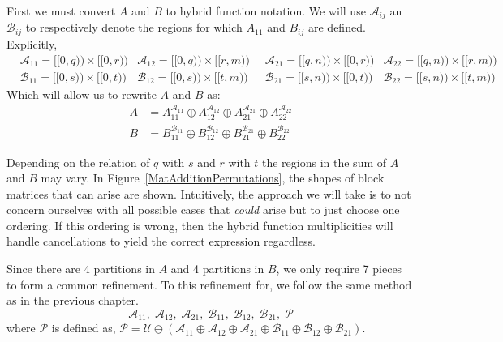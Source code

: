 First we must convert $A$ and $B$ to hybrid function notation. 
We will use $\mathcal{A}_{ij}$ an $\mathcal{B}_{ij}$ to respectively denote the regions for which 
$A_{11}$ and $B_{ij}$ are defined.
Explicitly,
\begin{align*}
	&\mathcal{A}_{11} = [\![0,q)\!) \times [\![0,r)\!) &
	\mathcal{A}_{12} = [\![0,q)\!) \times [\![r,m)\!)\;\; &
	\mathcal{A}_{21} = [\![q,n)\!) \times [\![0,r)\!) &
	\mathcal{A}_{22} = [\![q,n)\!) \times [\![r,m)\!) \\
	&\mathcal{B}_{11} = [\![0,s)\!) \times [\![0,t)\!) &
	\mathcal{B}_{12} = [\![0,s)\!) \times [\![t,m)\!)\;\; &
	\mathcal{B}_{21} = [\![s,n)\!) \times [\![0,t)\!) &
	\mathcal{B}_{22} = [\![s,n)\!) \times [\![t,m)\!)
\end{align*}
Which will allow us to rewrite $A$ and $B$ as:
\begin{align*}
	A &= A_{11}^{\mathcal{A}_{11}} \oplus 
		A_{12}^{\mathcal{A}_{12}} \oplus 
		A_{21}^{\mathcal{A}_{21}} \oplus 
		A_{22}^{\mathcal{A}_{22}} \\
	B &= B_{11}^{\mathcal{B}_{11}} \oplus 
		B_{12}^{\mathcal{B}_{12}} \oplus 
		B_{21}^{\mathcal{B}_{21}} \oplus 
		B_{22}^{\mathcal{B}_{22}} 
\end{align*}


Depending on the relation of $q$ with $s$ and $r$ with $t$ the regions in the sum of $A$ and $B$ may vary.
In Figure~\ref{MatAdditionPermutations}, the shapes of block matrices that can arise are shown.
Intuitively, the approach we will take is to not concern ourselves with all possible cases that \emph{could} arise but to just
choose one ordering.
If this ordering is wrong, then the hybrid function multiplicities will handle cancellations to yield the correct expression regardless.


Since there are 4 partitions in $A$ and 4 partitions in $B$, we only require 7 pieces to form a common refinement.
To this refinement for, we follow the same method as in the previous chapter.
\begin{equation}
	\label{eqn:2x2CommonRefinement}
	\mathcal{A}_{11}, \; \mathcal{A}_{12}, \;  \mathcal{A}_{21}, \;
	\mathcal{B}_{11}, \; \mathcal{B}_{12}, \; \mathcal{B}_{21}, \; \mathcal{P}
\end{equation}
where $\mathcal{P}$ is defined as,
$\mathcal{P} = \mathcal{U} 
		\ominus (\mathcal{A}_{11} \oplus \mathcal{A}_{12} \oplus \mathcal{A}_{21} \oplus
				\mathcal{B}_{11} \oplus \mathcal{B}_{12} \oplus \mathcal{B}_{21})$.


